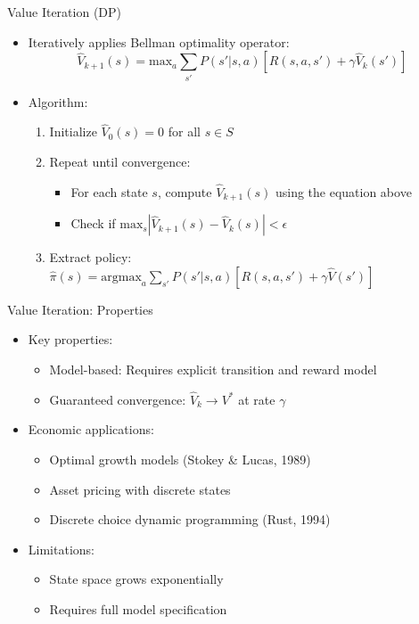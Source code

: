 \documentclass[10pt]{beamer}
\renewcommand{\max}{\text{max}}
\newcommand{\argmax}{\text{argmax}}
\begin{document}
\begin{frame}{Value Iteration (DP)}
    \begin{itemize}
        \item Iteratively applies Bellman optimality operator:
        \begin{equation}
            \hat{V}_{k+1}(s) = \max_a \sum_{s'} P(s'|s,a) \left[ R(s,a,s') + \gamma \hat{V}_k(s') \right]
        \end{equation}
        
        \item Algorithm:
        \begin{enumerate}
            \item Initialize $\hat{V}_0(s) = 0$ for all $s \in S$
            \item Repeat until convergence:
            \begin{itemize}
                \item For each state $s$, compute $\hat{V}_{k+1}(s)$ using the equation above
                \item Check if $\max_s |\hat{V}_{k+1}(s) - \hat{V}_k(s)| < \epsilon$
            \end{itemize}
            \item Extract policy: $\hat{\pi}(s) = \argmax_a \sum_{s'} P(s'|s,a) [R(s,a,s') + \gamma \hat{V}(s')]$
        \end{enumerate}
    \end{itemize}
\end{frame}

\begin{frame}{Value Iteration: Properties}
    \begin{itemize}
        \item Key properties:
        \begin{itemize}
            \item Model-based: Requires explicit transition and reward model
            \item Guaranteed convergence: $\hat{V}_k \to V^*$ at rate $\gamma$
        \end{itemize}
        \vspace{0.2cm}
        \item Economic applications:
        \begin{itemize}
            \item Optimal growth models (Stokey \& Lucas, 1989)
            \item Asset pricing with discrete states 
            \item Discrete choice dynamic programming (Rust, 1994)
        \end{itemize}
        \vspace{0.2cm}
        \item Limitations:
        \begin{itemize}
            \item State space grows exponentially
            \item Requires full model specification
        \end{itemize}
    \end{itemize}
\end{frame}
\end{document}
